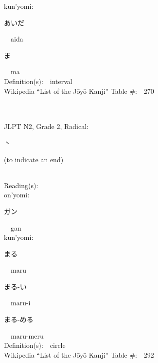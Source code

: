 \begin{multicols}{2}
{\hspace*{1em}}kun'yomi:\ \ \\
{\hspace*{2em}}{\begin{CJK}{UTF8}{min} あいだ \end{CJK}}\ \ aida\ \ \\
{\hspace*{2em}}{\begin{CJK}{UTF8}{min} ま \end{CJK}}\ \ ma\ \ \\
Definition(s):\ \ interval \\
Wikipedia ``List of the J\=oy\=o Kanji'' Table \#:\ \ 270 \\
\ \ \\
{\fontsize{34pt}{40pt}  }\ \ \\  %
{JLPT N2, Grade 2, Radical:\ \ {\begin{CJK}{UTF8}{min} 丶 \end{CJK}} (to indicate an end) } \\
Reading(s):\ \ \\
{\hspace*{1em}}on'yomi:\ \ \\
{\hspace*{2em}}{\begin{CJK}{UTF8}{min} ガン \end{CJK}}\ \ gan\ \ \\
{\hspace*{1em}}kun'yomi:\ \ \\
{\hspace*{2em}}{\begin{CJK}{UTF8}{min} まる \end{CJK}}\ \ maru\ \ \\
{\hspace*{2em}}{\begin{CJK}{UTF8}{min} まる-い \end{CJK}}\ \ maru-i\ \ \\
{\hspace*{2em}}{\begin{CJK}{UTF8}{min} まる-める \end{CJK}}\ \ maru-meru\ \ \\
Definition(s):\ \ circle \\
Wikipedia ``List of the J\=oy\=o Kanji'' Table \#:\ \ 292 \\

\end{multicols}
